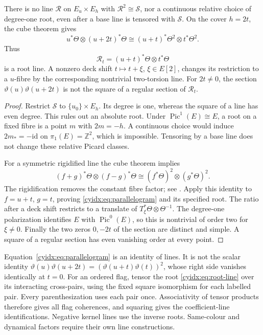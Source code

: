 \begin{theorem}\label{cyidx:thm:halving-cover}
There is no line \(\mathcal R\) on \(E_u\times E_h\)
with \(\mathcal R^2\cong\mathcal S\), nor a continuous
relative choice of degree-one root, even after a base
line is tensored with \(\mathcal S\).
On the cover \(h=2t\), the cube theorem gives
\begin{equation}\label{cyidx:eq:parallelogram}
 u^*\Theta\otimes(u+2t)^*\Theta
       \cong(u+t)^*\Theta^2\otimes t^*\Theta^2.
\end{equation}
Thus
\begin{equation}\label{cyidx:eq:root-line}
                  \mathcal R_t=(u+t)^*\Theta\otimes t^*\Theta
\end{equation}
is a root line. A nonzero deck shift \(t\mapsto t+\xi\),
\(\xi\in E[2]\), changes its restriction to a \(u\)-fibre
by the corresponding nontrivial two-torsion line.
For \(2t\ne0\), the section
\(\vartheta(u)\vartheta(u+2t)\) is not the square
of a regular section of \(\mathcal R_t\).
\end{theorem}
\begin{proof}
Restrict \(\mathcal S\) to \(\{u_0\}\times E_h\).
Its degree is one, whereas the square of a line has
even degree. This rules out an absolute root.
Under \(\operatorname{Pic}^1(E)\cong E\), a root
on a fixed fibre is a point \(m\) with \(2m=-h\).
A continuous choice would induce
\(2m_*=-\mathrm{id}\) on \(\pi_1(E)=\mathbb Z^2\),
which is impossible. Tensoring by a base line does
not change these relative Picard classes.

For a symmetric rigidified line the cube theorem
implies
\[
 (f+g)^*\Theta\otimes(f-g)^*\Theta
       \cong(f^*\Theta)^2\otimes(g^*\Theta)^2.
\]
The rigidification removes the constant fibre factor;
see \cite{StacksCube}. Apply this identity to
\(f=u+t\), \(g=t\), proving
\eqref{cyidx:eq:parallelogram} and its specified root.
The ratio after a deck shift restricts to a translate
of \(T_\xi^*\Theta\otimes\Theta^{-1}\). The
degree-one polarization identifies \(E\) with
\(\operatorname{Pic}^0(E)\), so this is nontrivial
of order two for \(\xi\ne0\).
Finally the two zeros \(0,-2t\) of the section are
distinct and simple. A square of a regular section
has even vanishing order at every point.
\end{proof}

Equation~\eqref{cyidx:eq:parallelogram} is an identity
of lines. It is not the scalar identity
\(\vartheta(u)\vartheta(u+2t)
  =(\vartheta(u+t)\vartheta(t))^2\), whose right
side vanishes identically at \(t=0\).
For an ordered flag, tensor the root
\eqref{cyidx:eq:root-line} over its interacting
cross-pairs, using the fixed square isomorphism for
each labelled pair. Every parenthesization uses each
pair once. Associativity of tensor products therefore
gives all flag coherences, and squaring gives the
coefficient-line identifications. Negative kernel
lines use the inverse roots. Same-colour and dynamical
factors require their own line constructions.

